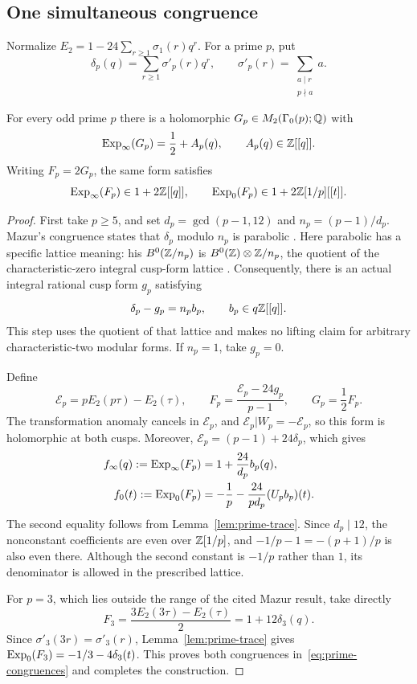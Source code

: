 \subsection{One simultaneous congruence}
Normalize $E_2=1-24\sum_{r\ge1}\sigma_1(r)q^r$. For a prime $p$, put
\[
 \delta_p(q)=\sum_{r\ge1}\sigma'_p(r)q^r,
 \qquad \sigma'_p(r)=\sum_{\substack{a\mid r\\p\nmid a}}a.
\]
\begin{lemma}\label{lem:Mazur}
For every odd prime $p$ there is a holomorphic
$G_p\in M_2(\Gamma_0(p);\mathbb Q)$ with
\[
 \operatorname{Exp}_\infty(G_p)=\frac12+A_p(q),\qquad A_p(q)\in\mathbb Z[[q]].
\]
Writing $F_p=2G_p$, the same form satisfies
\begin{equation}\label{eq:prime-congruences}
 \operatorname{Exp}_\infty(F_p)\in1+2\mathbb Z[[q]],\qquad
 \operatorname{Exp}_0(F_p)\in1+2\mathbb Z[1/p][[t]].
\end{equation}
\end{lemma}
\begin{proof}
First take $p\ge5$, and set
$d_p=\gcd(p-1,12)$ and $n_p=(p-1)/d_p$.
Mazur's congruence states that $\delta_p$ modulo $n_p$ is parabolic
\cite[II, Proposition~(5.12)(iii), pp.~85--87]{Mazur}. Here parabolic
has a specific lattice meaning: his $B^0(\mathbb Z/n_p)$ is
$B^0(\mathbb Z)\otimes\mathbb Z/n_p$, the quotient of the characteristic-zero
integral cusp-form lattice
\cite[II, Section~4(1), pp.~69--70, and (4.9), p.~77]{Mazur}.
Consequently, there is an actual integral rational cusp form $g_p$
satisfying
\[
 \delta_p-g_p=n_pb_p,\qquad b_p\in q\mathbb Z[[q]].
\]
This step uses the quotient of that lattice and makes no lifting
claim for arbitrary characteristic-two modular forms. If $n_p=1$,
take $g_p=0$.

Define
\begin{equation}\label{eq:prime-form}
 \mathcal E_p=pE_2(p\tau)-E_2(\tau),\qquad
 F_p=\frac{\mathcal E_p-24g_p}{p-1},\qquad G_p=\frac12F_p.
\end{equation}
The transformation anomaly cancels in $\mathcal E_p$, and
$\mathcal E_p|W_p=-\mathcal E_p$, so this form is holomorphic at
both cusps. Moreover, $\mathcal E_p=(p-1)+24\delta_p$, which gives
\begin{align}
 f_\infty(q):=\operatorname{Exp}_\infty(F_p)
   &=1+\frac{24}{d_p}b_p(q),\label{eq:prime-infinity}\\
 f_0(t):=\operatorname{Exp}_0(F_p)
   &=-\frac1p-\frac{24}{pd_p}(U_pb_p)(t).
   \label{eq:prime-zero}
\end{align}
The second equality follows from Lemma~\ref{lem:prime-trace}.
Since $d_p\mid12$, the nonconstant coefficients are even over
$\mathbb Z[1/p]$, and $-1/p-1=-(p+1)/p$ is also even there. Although
the second constant is $-1/p$ rather than $1$, its denominator
is allowed in the prescribed lattice.

For $p=3$, which lies outside the range of the cited Mazur result,
take directly
\begin{equation}\label{eq:level-three-form}
 F_3=\frac{3E_2(3\tau)-E_2(\tau)}2=1+12\delta_3(q).
\end{equation}
Since $\sigma'_3(3r)=\sigma'_3(r)$, Lemma~\ref{lem:prime-trace} gives
$\operatorname{Exp}_0(F_3)=-1/3-4\delta_3(t)$. This proves both congruences
in~\eqref{eq:prime-congruences} and completes the construction.
\end{proof}


